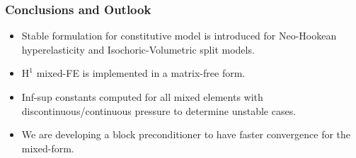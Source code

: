 \documentclass[aspectratio=169,xcolor=dvipsnames]{beamer}
\begin{document}
\begin{frame}
\frametitle{Conclusions and Outlook}	
\begin{itemize}
    \item Stable formulation for constitutive model is introduced for Neo-Hookean hyperelasticity and Isochoric-Volumetric split models.
    \item $\mathrm{H}^1$ mixed-FE is implemented in a matrix-free form.
    \item Inf-sup constants computed for all mixed elements with discontinuous/continuous pressure to determine unstable cases.
    \item We are developing a block preconditioner to have faster convergence for the mixed-form.
\end{itemize}

\end{frame}

\end{document}
